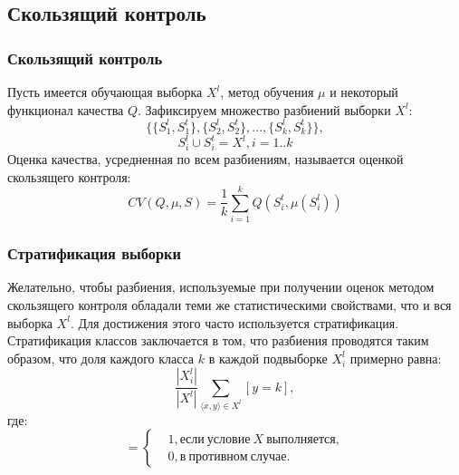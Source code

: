 \documentclass{beamer}
\begin{document}
\subsection{Скользящий контроль}
\begin{frame}
\frametitle{Скользящий контроль}
	Пусть имеется обучающая выборка $X^l$, метод обучения $\mu$ и некоторый функционал качества $Q$. Зафиксируем множество разбиений выборки $X^l$:
	$$\{\{S_1^l,S_1^t\},\{S_2^l,S_2^t\},...,\{S_k^l,S_k^t\}\},$$
	$$S_i^l \cup S_i^t = X^l, i=1..k$$
	Оценка качества, усредненная по всем разбиениям, называется оценкой скользящего контроля:
	$$CV(Q,\mu,S)=\frac{1}{k}\sum\limits_{i=1}^{k}Q(S_i^t,\mu(S_i^l))$$
\end{frame}

\begin{frame}
\frametitle{Стратификация выборки}
	Желательно, чтобы разбиения, используемые при получении оценок методом скользящего контроля обладали теми же статистическими свойствами, что и вся выборка $X^l$. Для достижения этого часто используется стратификация.
	\newline
	\newline
	Стратификация классов заключается в том, что разбиения проводятся таким образом, что доля каждого класса $k$ в каждой подвыборке $X_i^l$ примерно равна:
	$$\frac{|X_i^l|}{|X^l|}\sum\limits_{\langle x,y \rangle \in X^l}^{}[y=k],$$
	где:\\
	\begin{equation*}
	[X]=
	\begin{cases}
	&1, если\ условие\ X\ выполняется,\\
	&0, в\ противном\ случае.
	\end{cases}
	\end{equation*}
\end{frame}
\end{document}
